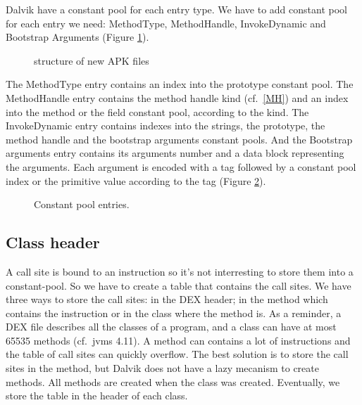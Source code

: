 \documentclass{sig-alternate}
\def \DALVIK{Dalvik\xspace}
\begin{document}
    \DALVIK have a constant pool for each entry type.
    We have to add constant pool for each entry we need:
    MethodType, MethodHandle, InvokeDynamic and Bootstrap Arguments (Figure \ref{SNA}).

    \begin{figure}[!h]
      \centering \resizebox{.55\linewidth}{!}{}
      \caption{structure of new APK files}
      \label{SNA}
    \end{figure}

    The MethodType entry contains an index into the prototype constant pool.
    The MethodHandle entry contains the method handle kind (cf.~\ref{MH})
    and an index into the method or the field constant pool, according to the kind.
    The InvokeDynamic entry contains indexes into the strings, the prototype,
    the method handle and the bootstrap arguments constant pools.
    And the Bootstrap arguments entry contains its arguments number
    and a data block representing the arguments.
    Each argument is encoded with a tag
    followed by a constant pool index or the primitive value according to the tag (Figure \ref{CPentries}).

    \begin{figure}[!h]
      \centering 
      \centering 
      \centering 
      \centering 
      \caption{Constant pool entries.}
      \label{CPentries}
    \end{figure}

  \subsection{Class header}

    A call site is bound to an instruction so it's not interresting to store them into a constant-pool.
    So we have to create a table that contains the call sites.
    We have three ways to store the call sites: in the DEX header; in the method which contains the instruction or in the class where the method is.
    As a reminder, a DEX file describes all the classes of a program, and a class can have at most 65535 methods (cf.~jvms 4.11).
    A method can contains a lot of instructions and the table of call sites can quickly overflow.
    The best solution is to store the call sites in the method, but \DALVIK does not have a lazy mecanism to create methods.
    All methods are created when the class was created.
    Eventually, we store the table in the header of each class.
\end{document}
